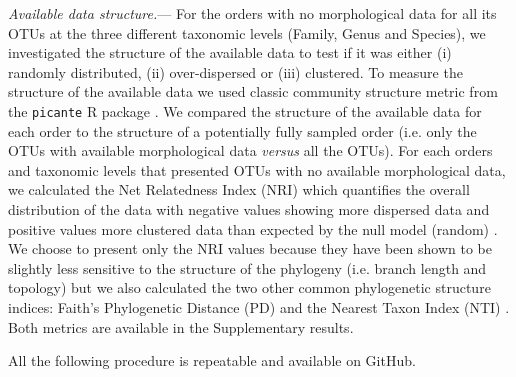 \documentclass[12pt,letterpaper]{article}
\renewcommand{\subsubsection}[1]{%
\vspace{2ex}
\noindent
\textit{#1.}---}
\begin{document}
\subsubsection{Available data structure}
For the orders with no morphological data for all its OTUs at the three different taxonomic levels (Family, Genus and Species), we investigated the structure of the available data to test if it was either (i) randomly distributed, (ii) over-dispersed or (iii) clustered. To measure the structure of the available data we used classic community structure metric from the \texttt{picante} R package \cite{picante}. We compared the structure of the available data for each order to the structure of a potentially fully sampled order (i.e. only the OTUs with available morphological data \textit{versus} all the OTUs).
For each orders and taxonomic levels that presented OTUs with no available morphological data, we calculated the Net Relatedness Index (NRI) which quantifies the overall distribution of the data with negative values showing more dispersed data and positive values more clustered data than expected by the null model (random) \cite{webb2002phylogenies}. We choose to present only the NRI values because they have been shown to be slightly less sensitive to the structure of the phylogeny (i.e. branch length and topology) \cite{NRI,journal.pone.0004390} but we also calculated the two other common phylogenetic structure indices: Faith's Phylogenetic Distance (PD) \cite{Faith19921} and the Nearest Taxon Index (NTI) \cite{webb2002phylogenies}. Both metrics are available in the Supplementary results.


All the following procedure is repeatable and available on GitHub. %

%
%
\end{document}
